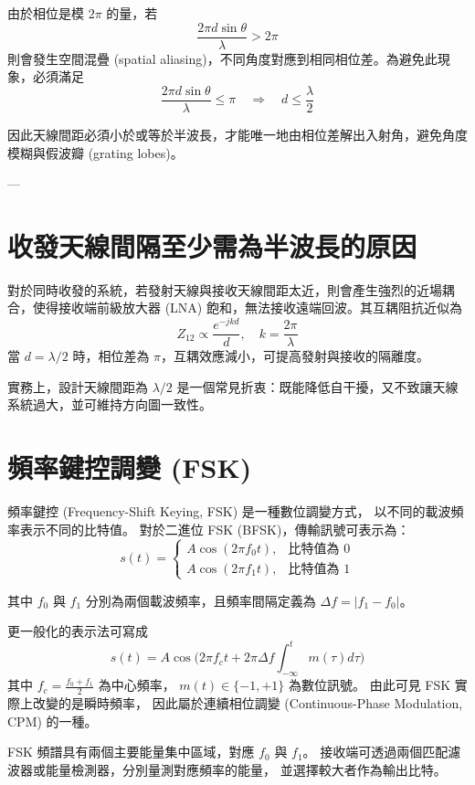 \documentclass{article}
\begin{document}
由於相位是模 $2\pi$ 的量，若
\[
\frac{2 \pi d \sin \theta}{\lambda} > 2\pi
\]
則會發生空間混疊 (spatial aliasing)，不同角度對應到相同相位差。為避免此現象，必須滿足
\[
\frac{2 \pi d \sin \theta}{\lambda} \leq \pi
\quad \Rightarrow \quad
d \leq \frac{\lambda}{2}
\]

因此天線間距必須小於或等於半波長，才能唯一地由相位差解出入射角，避免角度模糊與假波瓣 (grating lobes)。

---

\section*{收發天線間隔至少需為半波長的原因}

對於同時收發的系統，若發射天線與接收天線間距太近，則會產生強烈的近場耦合，使得接收端前級放大器 (LNA) 飽和，無法接收遠端回波。其互耦阻抗近似為
\[
Z_{12} \propto \frac{e^{-j k d}}{d},
\quad k = \frac{2\pi}{\lambda}
\]
當 $d = \lambda/2$ 時，相位差為 $\pi$，互耦效應減小，可提高發射與接收的隔離度。

實務上，設計天線間距為 $\lambda/2$ 是一個常見折衷：既能降低自干擾，又不致讓天線系統過大，並可維持方向圖一致性。

\section*{頻率鍵控調變 (FSK)}

頻率鍵控 (Frequency-Shift Keying, FSK) 是一種數位調變方式，
以不同的載波頻率表示不同的比特值。
對於二進位 FSK (BFSK)，傳輸訊號可表示為：
\[
s(t) =
\begin{cases}
A \cos(2 \pi f_0 t), & \text{比特值為 0} \\[6pt]
A \cos(2 \pi f_1 t), & \text{比特值為 1}
\end{cases}
\]

其中 $f_0$ 與 $f_1$ 分別為兩個載波頻率，且頻率間隔定義為
$\Delta f = |f_1 - f_0|$。

更一般化的表示法可寫成
\[
s(t) = A \cos \!\Bigg(
2\pi f_c t + 2\pi \Delta f \!\!\int_{-\infty}^{t} m(\tau) d\tau
\Bigg)
\]
其中 $f_c = \frac{f_0+f_1}{2}$ 為中心頻率，
$m(t) \in \{-1,+1\}$ 為數位訊號。
由此可見 FSK 實際上改變的是瞬時頻率，
因此屬於連續相位調變 (Continuous-Phase Modulation, CPM) 的一種。

FSK 頻譜具有兩個主要能量集中區域，對應 $f_0$ 與 $f_1$。
接收端可透過兩個匹配濾波器或能量檢測器，分別量測對應頻率的能量，
並選擇較大者作為輸出比特。
\end{document}
